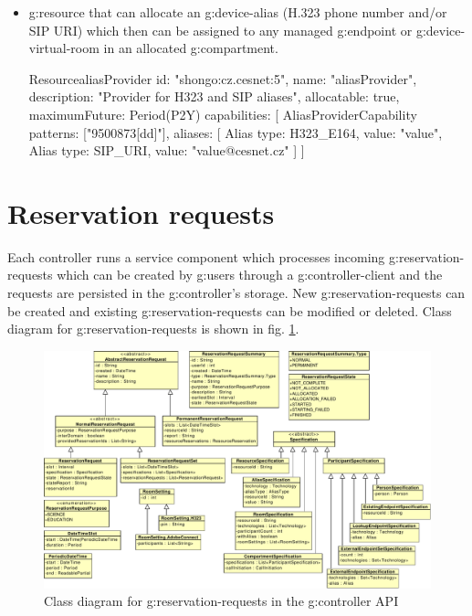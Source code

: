 \begin{itemize}
\item \Gls{g:resource} that can allocate an \gls{g:device-alias} (H.323 phone number and/or SIP URI) which then can be assigned to any managed \gls{g:endpoint} or \gls{g:device-virtual-room} in an allocated \gls{g:compartment}.

\begin{ObjectCode}{Resource}{aliasProvider}{}
id: "shongo:cz.cesnet:5",
name: "aliasProvider",
description: "Provider for H323 and SIP aliases",
allocatable: true,
maximumFuture: Period(P2Y)
capabilities: [  
  AliasProviderCapability {
    patterns: ["9500873[dd]"],
    aliases: [
	Alias { type: H323_E164, value: "{value}"},
	Alias { type: SIP_URI, value: "{value}@cesnet.cz"}
    ]
  }  
]
\end{ObjectCode}

\end{itemize}


\section{Reservation requests}
\label{sec:implementation-reservation-request}

Each controller runs a service component which processes incoming \glspl{g:reservation-request} which can be created by \glspl{g:user} through a \gls{g:controller-client} and the requests are persisted in the \gls{g:controller}'s storage. New \glspl{g:reservation-request} can be created and existing \glspl{g:reservation-request} can be modified or deleted. Class diagram for \glspl{g:reservation-request} is shown in fig. \ref{fig:cd_api_reservation_requests}.

\begin{figure}[ht!]
\includegraphics[width=\textwidth]{diagrams/cd_api_reservation_requests}
\caption{Class diagram for \glspl{g:reservation-request} in the \gls{g:controller} API}
\label{fig:cd_api_reservation_requests}
\end{figure}

